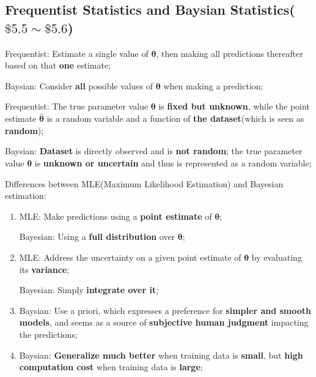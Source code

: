 \documentclass[12pt]{article}
\numberwithin{equation}{section}
\begin{document}
\subsection{Frequentist Statistics and Baysian Statistics($\$5.5 \sim \$5.6$)}
Frequentist: Estimate a single value of $\boldsymbol\theta$, then making all predictions thereafter based on that \textbf{one} estimate; \par
Baysian: Consider \textbf{all} possible values of $\boldsymbol\theta$ when making a prediction; \par
Frequentist: The true parameter value $\boldsymbol\theta$ is \textbf{fixed but unknown}, while the point estimate $\hat{\boldsymbol\theta}$ is a random variable and a function of \textbf{the dataset}(which is seen as \textbf{random}); \par
Baysian: \textbf{Dataset} is directly observed and is \textbf{not random}; the true parameter value $\boldsymbol\theta$ is \textbf{unknown or uncertain} and thus is represented as a random variable; \par
Differences between MLE(Maximum Likelihood Estimation) and Bayesian estimation:
\begin{enumerate}
	\item MLE: Make predictions using a \textbf{point estimate} of $\boldsymbol\theta$; \par
	Bayesian: Using a \textbf{full distribution} over $\boldsymbol\theta$;
	\item MLE: Address the uncertainty on a given point estimate of $\boldsymbol\theta$ by evaluating its \textbf{variance}; \par
	Bayesian: Simply \textbf{integrate over it};
	\item Baysian: Use a priori, which expresses a preference for \textbf{simpler and smooth models}, and seems as a source of \textbf{subjective human judgment} impacting the predictions; \par
	\item Baysian: \textbf{Generalize much better} when training data is \textbf{small}, but \textbf{high computation cost} when training data is \textbf{large};
\end{enumerate}
\end{document}
